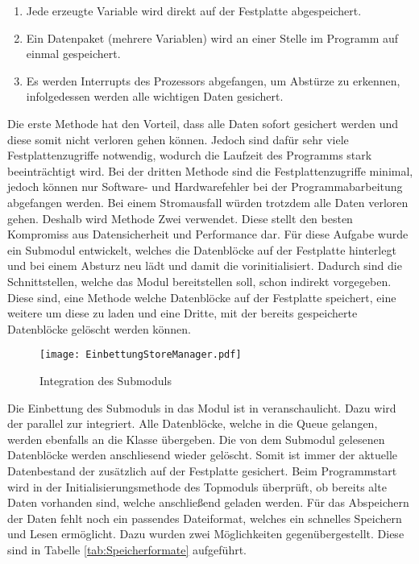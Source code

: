 \begin{enumerate}
\item Jede erzeugte Variable wird direkt auf der Festplatte abgespeichert.
\item Ein Datenpaket (mehrere Variablen) wird an einer Stelle im Programm auf
einmal gespeichert.
\item Es werden Interrupts des Prozessors abgefangen, um Abst{\"u}rze zu erkennen,
infolgedessen werden alle wichtigen Daten gesichert.
\end{enumerate}

Die erste Methode hat den Vorteil, dass alle Daten sofort gesichert werden und
diese somit nicht verloren gehen k{\"o}nnen. Jedoch sind daf{\"u}r sehr viele
Festplattenzugriffe notwendig, wodurch die Laufzeit des Programms stark
beeintr{\"a}chtigt wird. Bei der dritten Methode sind die Festplattenzugriffe
minimal, jedoch k{\"o}nnen nur Software- und Hardwarefehler bei der
Programmabarbeitung abgefangen werden. Bei einem Stromausfall w{\"u}rden
trotzdem alle Daten verloren gehen. Deshalb wird Methode Zwei verwendet. Diese
stellt den besten Kompromiss aus Datensicherheit und Performance dar. \newline
F{\"u}r diese Aufgabe wurde ein Submodul entwickelt, welches die Datenbl{\"o}cke
auf der Festplatte hinterlegt und bei einem Absturz neu l{\"a}dt und damit die
 vorinitialisiert. Dadurch sind die Schnittstellen,
welche das Modul bereitstellen soll, schon indirekt vorgegeben. Diese sind, eine
Methode welche Datenbl{\"o}cke auf der Festplatte speichert, eine weitere um
diese zu laden und eine Dritte, mit der bereits gespeicherte Datenbl{\"o}cke
gel{\"o}scht werden k{\"o}nnen.

\begin{figure}[H]
\centering
\texttt{[image: EinbettungStoreManager.pdf]}
\caption{Integration des Submoduls }
\label{fig:EinbettungStoreManager}
\end{figure}

Die Einbettung des Submoduls  in das Modul  ist
in  veranschaulicht. Dazu wird der
 parallel zur  integriert. Alle
Datenbl{\"o}cke, welche in die Queue gelangen, werden ebenfalls an die
Klasse  {\"u}bergeben. Die von dem Submodul 
gelesenen Datenbl{\"o}cke werden anschliesend wieder gel{\"o}scht. Somit ist immer der
aktuelle Datenbestand der 
zus{\"a}tzlich auf der Festplatte gesichert. Beim Programmstart wird in der
Initialisierungsmethode des Topmoduls {\"u}berpr{\"u}ft, ob bereits alte Daten vorhanden
sind, welche anschlie{\ss}end geladen werden. \newline
F{\"u}r das Abspeichern der
Daten fehlt noch ein passendes Dateiformat, welches ein schnelles Speichern und
Lesen erm{\"o}glicht. Dazu wurden zwei M{\"o}glichkeiten gegen{\"u}bergestellt. Diese sind
in Tabelle \ref{tab:Speicherformate} aufgef{\"u}hrt.


